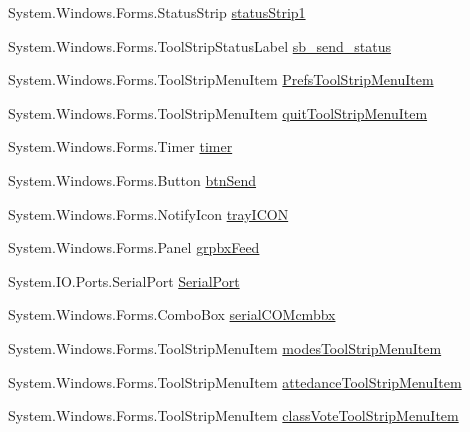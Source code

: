 \begin{DoxyCompactItemize}
\item 
\-System.\-Windows.\-Forms.\-Status\-Strip \hyperlink{class_sr_p___classroom_inq_1_1frm_classrrom_inq_a3d73a45e941d1d5e3ac5a00180dde14a}{status\-Strip1}
\item 
\-System.\-Windows.\-Forms.\-Tool\-Strip\-Status\-Label \hyperlink{class_sr_p___classroom_inq_1_1frm_classrrom_inq_a339bcec3d748bdf74b502189fd7ca9db}{sb\-\_\-send\-\_\-status}
\item 
\-System.\-Windows.\-Forms.\-Tool\-Strip\-Menu\-Item \hyperlink{class_sr_p___classroom_inq_1_1frm_classrrom_inq_ab36e4efbf8b003fc5007cc6522901c21}{\-Prefs\-Tool\-Strip\-Menu\-Item}
\item 
\-System.\-Windows.\-Forms.\-Tool\-Strip\-Menu\-Item \hyperlink{class_sr_p___classroom_inq_1_1frm_classrrom_inq_a7e4ada35eda1d7984167b62ab487ace7}{quit\-Tool\-Strip\-Menu\-Item}
\item 
\-System.\-Windows.\-Forms.\-Timer \hyperlink{class_sr_p___classroom_inq_1_1frm_classrrom_inq_ac5fec0fdbc135ddcefc976786801ee05}{timer}
\item 
\-System.\-Windows.\-Forms.\-Button \hyperlink{class_sr_p___classroom_inq_1_1frm_classrrom_inq_a5a1b78305ac1e8f7eb40a5d135fa3525}{btn\-Send}
\item 
\-System.\-Windows.\-Forms.\-Notify\-Icon \hyperlink{class_sr_p___classroom_inq_1_1frm_classrrom_inq_a8c062d5fe665631b364688c76e36e7f7}{tray\-I\-C\-O\-N}
\item 
\-System.\-Windows.\-Forms.\-Panel \hyperlink{class_sr_p___classroom_inq_1_1frm_classrrom_inq_aef19294d5a98aeb9030537fe32d25fde}{grpbx\-Feed}
\item 
\-System.\-I\-O.\-Ports.\-Serial\-Port \hyperlink{class_sr_p___classroom_inq_1_1frm_classrrom_inq_ae7bb088b1faefea06978daccf238ecd0}{\-Serial\-Port}
\item 
\-System.\-Windows.\-Forms.\-Combo\-Box \hyperlink{class_sr_p___classroom_inq_1_1frm_classrrom_inq_a78530d93c34ef9033ba7bd57c265782a}{serial\-C\-O\-Mcmbbx}
\item 
\-System.\-Windows.\-Forms.\-Tool\-Strip\-Menu\-Item \hyperlink{class_sr_p___classroom_inq_1_1frm_classrrom_inq_a8eef2c0ef527338feb8e51e6ddef9cc1}{modes\-Tool\-Strip\-Menu\-Item}
\item 
\-System.\-Windows.\-Forms.\-Tool\-Strip\-Menu\-Item \hyperlink{class_sr_p___classroom_inq_1_1frm_classrrom_inq_a2ccfb297c675044ba746ce9c6839c2bc}{attedance\-Tool\-Strip\-Menu\-Item}
\item 
\-System.\-Windows.\-Forms.\-Tool\-Strip\-Menu\-Item \hyperlink{class_sr_p___classroom_inq_1_1frm_classrrom_inq_add88d2c77e31773b18b9a6b571f3207f}{class\-Vote\-Tool\-Strip\-Menu\-Item}

\end{DoxyCompactItemize}
